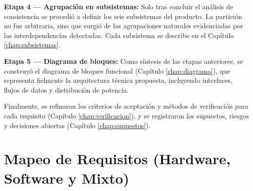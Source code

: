 \documentclass[%
	paper=a4,
	twoside=false,
	parskip=half,
	chapterprefix=false,
	10pt,
	headings=normal,
	bibliography=totoc,
	listof=totoc,
	titlepage=on,
	captions=tableabove,
	draft=false, 
]{scrbook}%
\begin{document}
\textbf{Etapa 4 — Agrupación en subsistemas:} Solo tras concluir el análisis de consistencia se procedió a definir los seis subsistemas del producto. La partición no fue arbitraria, sino que surgió de las agrupaciones naturales evidenciadas por las interdependencias detectadas. Cada subsistema se describe en el Capítulo \ref{chap:subsistemas}.

\textbf{Etapa 5 — Diagrama de bloques:} Como síntesis de las etapas anteriores, se construyó el diagrama de bloques funcional (Capítulo \ref{chap:diagrama}), que representa fielmente la arquitectura técnica propuesta, incluyendo interfaces, flujos de datos y distribución de potencia.

Finalmente, se refinaron los criterios de aceptación y métodos de verificación para cada requisito (Capítulo \ref{chap:verificacion}), y se registraron los supuestos, riesgos y decisiones abiertas (Capítulo \ref{chap:supuestos}).

\chapter{Mapeo de Requisitos (Hardware, Software y Mixto)}
\label{chap:mapeo}
\end{document}
